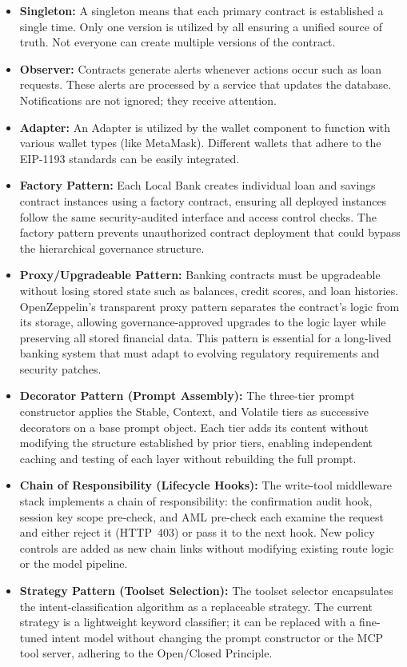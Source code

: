 \documentclass[12pt, a4paper]{report}
\begin{document}
\begin{itemize}[noitemsep]
\item \textbf{Singleton:} A singleton means that each primary contract is established a single time. Only one version is utilized by all ensuring a unified source of truth. Not everyone can create multiple versions of the contract.

\item \textbf{Observer:} Contracts generate alerts whenever actions occur such as loan requests. These alerts are processed by a service that updates the database. Notifications are not ignored; they receive attention.

\item \textbf{Adapter:} An Adapter is utilized by the wallet component to function with various wallet types (like MetaMask). Different wallets that adhere to the EIP-1193 standards can be easily integrated.

\item \textbf{Factory Pattern:} Each Local Bank creates individual loan and savings contract instances using a factory contract, ensuring all deployed instances follow the same security-audited interface and access control checks. The factory pattern prevents unauthorized contract deployment that could bypass the hierarchical governance structure.

\item \textbf{Proxy/Upgradeable Pattern:} Banking contracts must be upgradeable without losing stored state such as balances, credit scores, and loan histories. OpenZeppelin's transparent proxy pattern separates the contract's logic from its storage, allowing governance-approved upgrades to the logic layer while preserving all stored financial data. This pattern is essential for a long-lived banking system that must adapt to evolving regulatory requirements and security patches.

\item \textbf{Decorator Pattern (Prompt Assembly):} The three-tier prompt
constructor applies the Stable, Context, and Volatile tiers as successive
decorators on a base prompt object. Each tier adds its content without modifying
the structure established by prior tiers, enabling independent caching and testing
of each layer without rebuilding the full prompt.

\item \textbf{Chain of Responsibility (Lifecycle Hooks):} The write-tool middleware
stack implements a chain of responsibility: the confirmation audit hook, session
key scope pre-check, and AML pre-check each examine the request and either reject
it (HTTP~403) or pass it to the next hook. New policy controls are added as new
chain links without modifying existing route logic or the model
pipeline.

\item \textbf{Strategy Pattern (Toolset Selection):} The toolset selector
encapsulates the intent-classification algorithm as a replaceable strategy. The
current strategy is a lightweight keyword classifier; it can be replaced with a
fine-tuned intent model without changing the prompt constructor or the MCP tool
server, adhering to the Open/Closed Principle.
\end{itemize}
\end{document}
